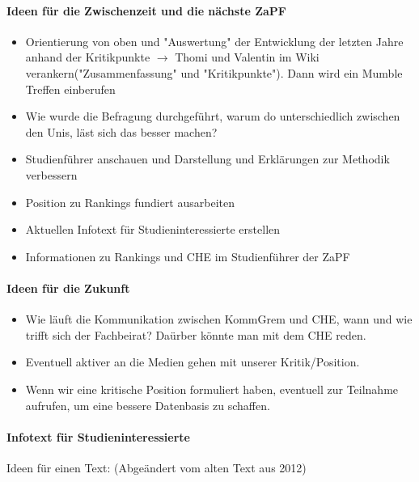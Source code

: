     \paragraph{Ideen für die Zwischenzeit und die nächste ZaPF}
      \begin{itemize}
        \item Orientierung von oben und "Auswertung" der Entwicklung der letzten Jahre anhand der Kritikpunkte $\rightarrow$ Thomi und Valentin im Wiki verankern("Zusammenfassung" und "Kritikpunkte"). Dann wird ein Mumble Treffen einberufen
        \item Wie wurde die Befragung durchgeführt, warum do unterschiedlich zwischen den Unis, läst sich das besser machen?
        \item Studienführer anschauen und Darstellung und Erklärungen zur Methodik verbessern
        \item Position zu Rankings fundiert ausarbeiten
        \item Aktuellen Infotext für Studieninteressierte erstellen
        \item Informationen zu Rankings und CHE im Studienführer der ZaPF
      \end{itemize}

    \paragraph{Ideen für die Zukunft}
      \begin{itemize}
        \item Wie läuft die Kommunikation zwischen KommGrem und CHE, wann und wie trifft sich der Fachbeirat? Daürber könnte man mit dem CHE reden.
        \item Eventuell aktiver an die Medien gehen mit unserer Kritik/Position.
        \item Wenn wir eine kritische Position formuliert haben, eventuell zur Teilnahme aufrufen, um eine bessere Datenbasis zu schaffen.
      \end{itemize}

    \paragraph{Infotext für Studieninteressierte}
      Ideen für einen Text: (Abgeändert vom alten Text aus 2012) \\


